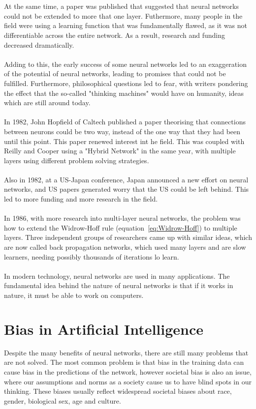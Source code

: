 \documentclass[titlepage]{article}
\begin{document}
\\\\
At the same time, a paper was published that suggested that neural networks could not be extended to more that one layer. Futhermore, many people in the field were using a learning function that was fundamentally flawed, as it was not differentiable across the entire network. As a result, research and funding decreased dramatically.
\\\\
Adding to this, the early success of some neural networks led to an exaggeration of the potential of neural networks, leading to promises that could not be fulfilled. Furthermore, philosophical questions led to fear, with writers pondering the effect that the so-called "thinking machines" would have on humanity, ideas which are still around today.
\\\\
In 1982, John Hopfield of Caltech published a paper theorising that connections between neurons could be two way, instead of the one way that they had been until this point. This paper renewed interest int he field. This was coupled with Reilly and Cooper using a "Hybrid Network" in the same year, with multiple layers using different problem solving strategies.
\\\\
Also in 1982, at a US-Japan conference, Japan announced a new effort on neural networks, and US papers generated worry that the US could be left behind. This led to more funding and more research in the field.
\\\\
In 1986, with more research into multi-layer neural networks, the problem was how to extend the Widrow-Hoff rule (equation~\ref{eq:Widrow-Hoff}) to multiple layers. Three independent groups of researchers came up with similar ideas, which are now called back propagation networks, which used many layers and are slow learners, needing possibly thousands of iterations lo learn.
\\\\
In modern technology, neural networks are used in many applications. The fundamental idea behind the nature of neural networks is that if it works in nature, it must be able to work on computers. \cite{History of Neural Networks}
\newpage
\section{Bias in Artificial Intelligence}
Despite the many benefits of neural networks, there are still many problems that are not solved. The most common problem is that bias in the training data can cause bias in the predictions of the network, however societal bias is also an issue, where our assumptions and norms as a society cause us to have blind spots in our thinking. These biases usually reflect widespread societal biases about race, gender, biological sex, age and culture. \cite{Bias in Artificial Intelligence}
\end{document}
